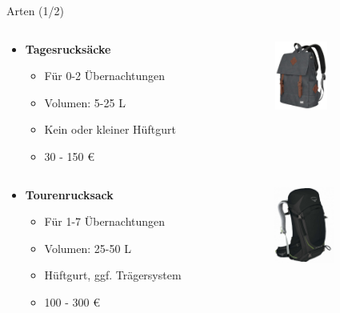 \documentclass[aspectratio=169]{beamer}
\begin{document}
			\begin{frame}{Arten (1/2)}
				\begin{columns}[c]
					\begin{column}{0.64\textwidth}
						\begin{itemize}
							\item \textbf{Tagesrucksäcke}
							\begin{itemize}
								\item Für 0-2 Übernachtungen
								\item Volumen: 5-25 L
								\item Kein oder kleiner Hüftgurt
								\item 30 - 150 €
							\end{itemize}
						\end{itemize}
					\end{column}
					\begin{column}{0.34\textwidth}
						\includegraphics[height=2.25cm]{images/backpack-small.png}
					\end{column}
				\end{columns}
				\vspace{0.4cm}
				\pause
				\begin{columns}[c]
					\begin{column}{0.64\textwidth}
						\begin{itemize}
							\item \textbf{Tourenrucksack}
							\begin{itemize}
								\item Für 1-7 Übernachtungen
								\item Volumen: 25-50 L
								\item Hüftgurt, ggf. Trägersystem
								\item 100 - 300 €
							\end{itemize}
						\end{itemize}
					\end{column}
					\begin{column}{0.34\textwidth}
						\includegraphics[height=2.5cm]{images/backpack-medium.png}
					\end{column}
				\end{columns}
			\end{frame}
				
\end{document}
